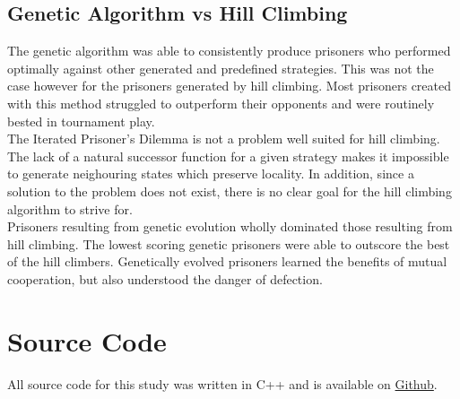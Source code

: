 \documentclass[12pt]{article}
\begin{document}
\subsection{Genetic Algorithm vs Hill Climbing}
The genetic algorithm was able to consistently produce prisoners who performed
optimally against other generated and predefined strategies. This was not the
case however for the prisoners generated by hill climbing. Most prisoners created with this method struggled to outperform their opponents
and were routinely bested in tournament play. \\

The Iterated Prisoner's Dilemma is not a problem well suited for hill climbing.
The lack of a natural successor function for a given strategy makes it impossible
to generate neighouring states which preserve locality.  In addition, since
a solution to the problem does not exist, there is no clear goal for the hill climbing algorithm
to strive for. \\


Prisoners resulting from genetic evolution wholly dominated those resulting
from hill climbing.  The lowest scoring genetic prisoners were able to outscore
the best of the hill climbers.  Genetically evolved prisoners learned the benefits
of mutual cooperation, but also understood the danger of defection.

\pagebreak

\section{Source Code}
All source code for this study was written in C++ and is
available on
\href{https://github.com/Quinny/IteratedPrisoners}{Github}.
\end{document}
